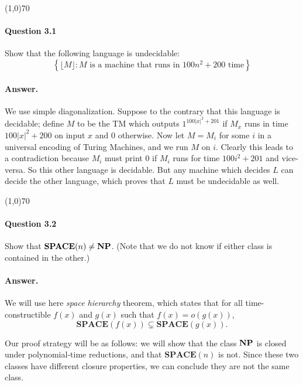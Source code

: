 \begin{center}
	\line(1,0){70}
\end{center}

\paragraph{Question 3.1} Show that the following language is undecidable:
\begin{equation*}
	\left\{\lfloor M\rfloor: M \text{ is a machine that runs in } 100n^2+200 \text{ time}\right\}
\end{equation*}
\paragraph{Answer.} We use simple diagonalization. Suppose to the contrary that this language is decidable; define $M$ to be the TM which outputs $1^{100|x|^2+201}$ if $M_x$ runs in time $100|x|^2+200$ on input $x$ and $0$ otherwise. Now let $M=M_i$ for some $i$ in a universal encoding of Turing Machines, and we run $M$ on $i$. Clearly this leads to a contradiction because $M_i$ must print $0$ if $M_i$ runs for time $100i^2+201$ and vice-versa. So this other language is decidable. But any machine which decides $L$ can decide the other language, which proves that $L$ must be undecidable as well.

\begin{center}
	\line(1,0){70}
\end{center}

\paragraph{Question 3.2} Show that $\mathbf{SPACE}(n)\neq\mathbf{NP}$. (Note that we do not know if either class is contained in the other.)

\paragraph{Answer.} We will use here \textit{space hierarchy} theorem, which states that for all time-constructible $f(x)$ and $g(x)$ such that $f(x)=o(g(x))$, 
\begin{equation*}
	\mathbf{SPACE}(f(x))\subsetneq\mathbf{SPACE}(g(x)).
\end{equation*}

Our proof strategy will be as follows: we will show that the class $\mathbf{NP}$ is closed under polynomial-time reductions, and that $\mathbf{SPACE}(n)$ is not. Since these two classes have different closure properties, we can conclude they are not the same class.


